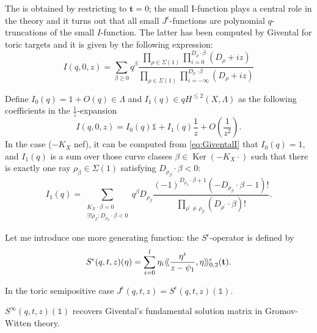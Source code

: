 The  is obtained by restricting to $\mathbf t=0$; the small I-function plays a central role in the theory and it turns out that all small $J^\epsilon$-functions are polynomial $q$-truncations of the small $I$-function.
The latter has been computed by Givental for toric targets and it is given by the following expression:
\begin{equation}\label{eq:GiventalI} I(q,0,z)=\sum_{\beta\geq 0}q^\beta \frac{\prod_{\rho\in\Sigma(1)}\prod_{i=0}^{D_\rho\cdot\beta}(D_\rho+iz)}{\prod_{\rho\in\Sigma(1)}\prod_{i=-\infty}^{D_\rho\cdot\beta}(D_\rho+iz)}\end{equation}

Define $I_0(q)= 1+O(q)\in \Lambda$ and $I_1(q)\in qH^{\leq 2}(X,\Lambda)$ as the following coefficients in the $\frac{1}{z}$-expansion
\[I(q,0,z)=I_0(q)\mathds{1}+I_1(q)\frac{1}{z}+O(\frac{1}{z^2}).\]
In the  case ($-K_X$ nef), it can be computed from \eqref{eq:GiventalI} that $I_0(q)=1$, and $I_1(q)$ is a sum over those curve classes $\beta\in \operatorname{Ker}(-K_X\cdot )$ such that there is exactly one ray $\rho_\beta\in\Sigma(1)$ satisfying $D_{\rho_\beta}\cdot\beta <0$:
\[I_1(q)=\sum_{\substack{K_X\cdot\beta=0 \\ \exists!\rho_\beta:D_{\rho_\beta}\cdot\beta<0}}q^\beta D_{\rho_\beta}\frac{(-1)^{D_{\rho_\beta}\cdot\beta+1}(-D_{\rho_\beta}\cdot\beta-1)!}{\prod_{\rho^\prime\neq\rho_\beta}(D_{\rho^\prime}\cdot\beta)!}.\]

Let me introduce one more generating function: the $S^\epsilon$-operator is defined by
\[S^\epsilon(q,t,z)(\eta)=\sum_{i=0}^l \eta_i \langle\!\langle \frac{\eta^i}{z-\psi_1},\eta\rangle\!\rangle^\epsilon_{0,2}(\mathbf{t}).\]

\begin{lem} \cite[Theorem 1.3.1]{CF-K-wallcrossing} In the toric semipositive case $J^\epsilon(q,t,z)=S^\epsilon(q,t,z)(\mathds{1})$. \end{lem}

$S^\infty(q,t,z)(\mathds{1})$ recovers Givental's fundamental solution matrix in Gromov-Witten theory.

